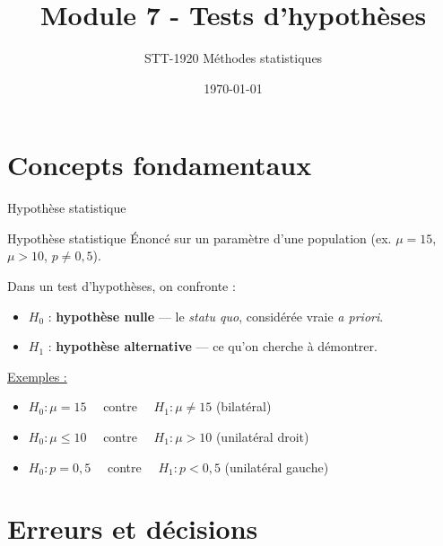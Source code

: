 \documentclass{BeamerTemplate}
\title{Module 7 - Tests d'hypothèses}
\subtitle{STT-1920 Méthodes statistiques}
\date{\today}
\begin{document}
\begin{frame}[t]
  \titlepage
\end{frame}

\section{Concepts fondamentaux}

\begin{frame}[t]{Hypothèse statistique}

\begin{Boite}{Hypothèse statistique}
Énoncé sur un paramètre d'une population (ex. $\mu = 15$, $\mu > 10$, $p \neq 0{,}5$).
\end{Boite}

\medskip
Dans un test d'hypothèses, on confronte :
\begin{itemize}\itemsep5mm
  \item $H_0$ : \textbf{hypothèse nulle} — le \textit{statu quo}, considérée vraie \textit{a priori}.
  \item $H_1$ : \textbf{hypothèse alternative} — ce qu'on cherche à démontrer.
\end{itemize}

\bigskip
\underline{Exemples :}
\begin{itemize}\itemsep3mm
  \item $H_0 : \mu = 15 \quad$ contre $\quad H_1 : \mu \ne 15$ \quad (bilatéral)
  \item $H_0 : \mu \le 10 \quad$ contre $\quad H_1 : \mu > 10$ \quad (unilatéral droit)
  \item $H_0 : p = 0{,}5 \quad$ contre $\quad H_1 : p < 0{,}5$ \quad (unilatéral gauche)
\end{itemize}

\end{frame}

\section{Erreurs et décisions}
\end{document}

